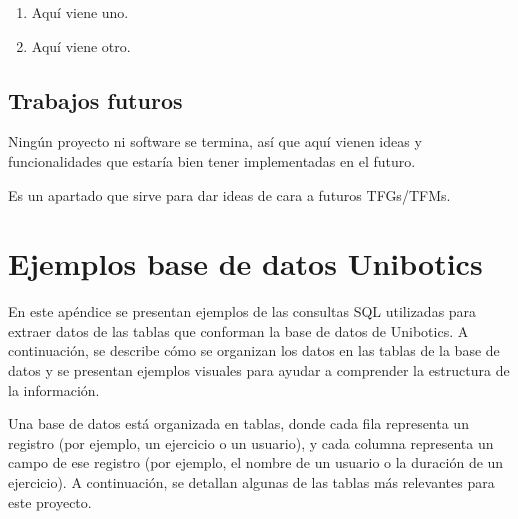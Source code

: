 \documentclass[a4paper, 12pt]{book}
\begin{document}
\begin{enumerate}
  \item Aquí viene uno.
  \item Aquí viene otro.
\end{enumerate}


\section{Trabajos futuros}
\label{sec:trabajos_futuros}

Ningún proyecto ni software se termina, así que aquí vienen ideas y funcionalidades que estaría bien tener implementadas en el futuro.

Es un apartado que sirve para dar ideas de cara a futuros TFGs/TFMs.



\printglossary[type=\acronymtype]

\printglossary


\cleardoublepage
\appendix
\chapter{Ejemplos base de datos Unibotics}
\label{sec:appA}


En este apéndice se presentan ejemplos de las consultas SQL utilizadas para extraer datos de las tablas que conforman la base de datos de Unibotics. A continuación, se describe cómo se organizan los datos en las tablas de la base de datos y se presentan ejemplos visuales para ayudar a comprender la estructura de la información.

Una base de datos está organizada en tablas, donde cada fila representa un registro (por ejemplo, un ejercicio o un usuario), y cada columna representa un campo de ese registro (por ejemplo, el nombre de un usuario o la duración de un ejercicio). A continuación, se detallan algunas de las tablas más relevantes para este proyecto.
\end{document}
